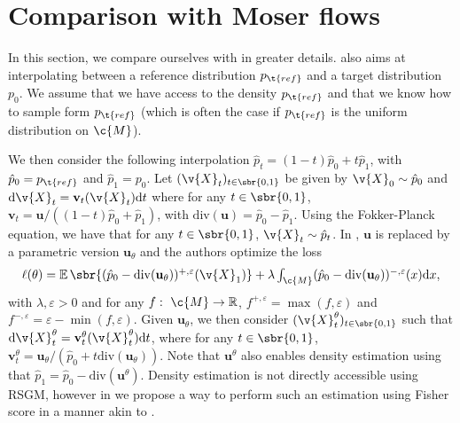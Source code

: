 \section{Comparison with Moser flows}
\label{sec:comp-with-moser}
In this section, we compare ourselves with \textcite{rozen2021moser} in greater details.
\textcite{rozen2021moser} also aims at interpolating between a reference
distribution $p_{\t{ref}}$ and a target distribution $p_0$.
We assume that we have access to the density $p_{\t{ref}}$ and that we know how to sample form $p_{\t{ref}}$ (which is often the case if $p_{\t{ref}}$ is the uniform distribution on $\c{M}$).

We then consider the following interpolation $\hat{p}_t = (1-t) \hat{p}_0 + t \hat{p}_1$, with $\hat{p}_0 = p_{\t{ref}}$ and $\hat{p}_1 = p_0$.
Let $(\v{X}_t)_{t \in \sbr{0,1}}$ be given by $\v{X}_0 \sim \hat{p}_0$ and $\mathrm{d} \v{X}_t = \mathbf{v}_t(\v{X}_t) \mathrm{d} t$ where for any $t \in \sbr{0,1}$, $\mathbf{v}_t = \mathbf{u} / ((1-t) \hat{p}_0 + \hat{p}_1)$, with $\mathrm{div}(\mathbf{u}) = \hat{p}_0 - \hat{p}_1$.
Using the Fokker-Planck equation, we have that for any $t \in \sbr{0,1}$, $\v{X}_t \sim \hat{p}_t$.
In \textcite{rozen2021moser}, $\mathbf{u}$ is replaced by a parametric version $\mathbf{u}_\theta$ and the authors optimize the loss \begin{equation} \textstyle{ \ell(\theta) = \E\sbr{(\hat{p}_0 - \mathrm{div}(\mathbf{u}_\theta))^{+, \varepsilon}(\v{X}_1)} + \lambda \int_\c{M} (\hat{p}_0 - \mathrm{div}(\mathbf{u}_\theta))^{-, \varepsilon}(x) \mathrm{d} x , } \end{equation} with $\lambda, \varepsilon >0$ and for any $f: \ \c{M} \to \R$, $f^{+, \varepsilon} = \max(f, \varepsilon)$ and $f^{-, \varepsilon} = \varepsilon - \min(f, \varepsilon)$.
Given $\mathbf{u}_\theta$, we then consider $(\v{X}_t^\theta)_{t \in \sbr{0,1}}$ such that $\mathrm{d} \v{X}_t^\theta = \mathbf{v}_{t}^\theta(\v{X}_t^\theta) \mathrm{d} t$, where for any $t \in \sbr{0,1}$, $\mathbf{v}_{t}^\theta = \mathbf{u}_\theta / (\hat{p}_0 + t \mathrm{div}(\mathbf{u}_\theta))$.
Note that $\mathbf{u}^\theta$ also enables density estimation using that $\hat{p}_1 = \hat{p}_0 - \mathrm{div}(\mathbf{u}^\theta)$.
Density estimation is not directly accessible using RSGM, however in  we propose a way to perform such an estimation using Fisher score in a manner akin to \textcite{choi2021density}.

